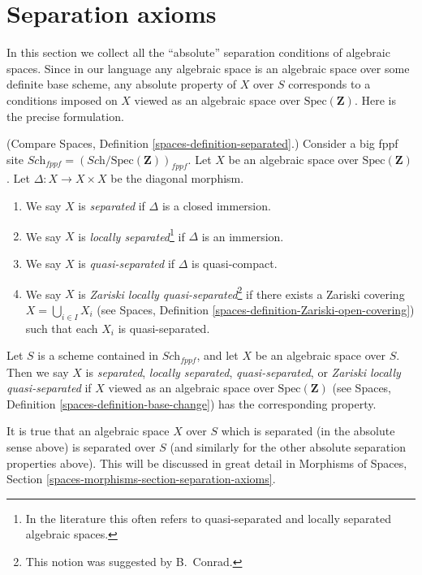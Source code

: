 \section{Separation axioms}
\label{section-separation}

\noindent
In this section we collect all the ``absolute'' separation conditions
of algebraic spaces. Since in our language any algebraic space is an
algebraic space over some definite base scheme, any absolute property
of $X$ over $S$ corresponds to a conditions imposed on $X$ viewed
as an algebraic space over $\text{Spec}(\mathbf{Z})$. Here is the
precise formulation.

\begin{definition}
\label{definition-separated}
(Compare Spaces, Definition \ref{spaces-definition-separated}.)
Consider a big fppf site
$\textit{Sch}_{fppf} = (\textit{Sch}/\text{Spec}(\mathbf{Z}))_{fppf}$.
Let $X$ be an algebraic space over
$\text{Spec}(\mathbf{Z})$. Let $\Delta : X \to X \times X$
be the diagonal morphism.
\begin{enumerate}
\item We say $X$ is {\it separated} if $\Delta$ is a closed immersion.
\item We say $X$ is {\it locally separated}\footnote{In the
literature this often refers to quasi-separated and locally
separated algebraic spaces.} if $\Delta$ is an
immersion.
\item We say $X$ is {\it quasi-separated} if $\Delta$ is quasi-compact.
\item We say $X$ is {\it Zariski locally quasi-separated}\footnote{
This notion was suggested by B.\ Conrad.} if there
exists a Zariski covering $X = \bigcup_{i \in I} X_i$ (see Spaces,
Definition \ref{spaces-definition-Zariski-open-covering}) such that
each $X_i$ is quasi-separated.
\end{enumerate}
Let $S$ is a scheme contained in $\textit{Sch}_{fppf}$, and let
$X$ be an algebraic space over $S$. Then we say $X$ is {\it separated},
{\it locally separated}, {\it quasi-separated}, or
{\it Zariski locally quasi-separated}
if $X$ viewed as an algebraic space over $\text{Spec}(\mathbf{Z})$ (see
Spaces, Definition \ref{spaces-definition-base-change})
has the corresponding property.
\end{definition}

\noindent
It is true that an algebraic space $X$ over $S$ which is separated
(in the absolute sense above) is separated over $S$ (and similarly
for the other absolute separation properties above). This will be discussed
in great detail in
Morphisms of Spaces, Section \ref{spaces-morphisms-section-separation-axioms}.

